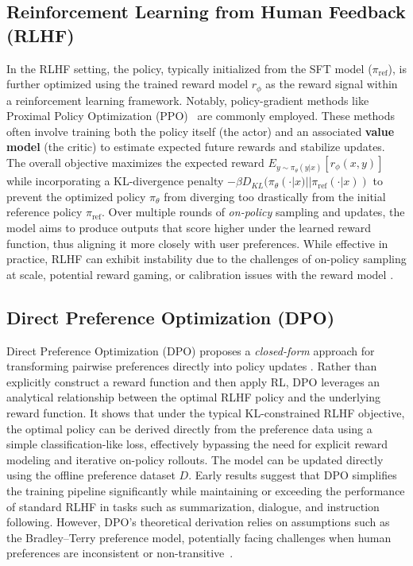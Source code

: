 \documentclass[a4paper,oneside,10pt,ngerman,english]{scrartcl}
\begin{document}
\subsection{Reinforcement Learning from Human Feedback (RLHF)}
\label{sec:rlhf-pipeline}
In the RLHF setting, the policy, typically initialized from the SFT model ($\pi_{\text{ref}}$), is further optimized using the
trained reward model $r_\phi$ as the reward signal within a reinforcement learning framework. Notably, policy-gradient methods like Proximal Policy Optimization (PPO)~\cite{bib:Schulman2017} are commonly employed. These methods often involve training both the policy itself (the actor) and an associated \textbf{value model} (the critic) to estimate expected future rewards and stabilize updates. The overall objective maximizes the expected reward $E_{y \sim \pi_\theta(y|x)}[r_\phi(x,y)]$ while incorporating a KL-divergence penalty $-\beta D_{KL}(\pi_\theta(\cdot|x) || \pi_{\text{ref}}(\cdot|x))$ to prevent the optimized policy $\pi_\theta$ from diverging too drastically from the initial reference policy $\pi_{\text{ref}}$. Over multiple rounds of
\emph{on-policy} sampling and updates, the model aims to produce outputs that score higher
under the learned reward function, thus aligning it more closely with user preferences. While
effective in practice, RLHF can exhibit instability due to the challenges of on-policy sampling at scale, potential reward
gaming, or calibration issues with the reward model \cite{bib:Gao2023}.

\subsection{Direct Preference Optimization (DPO)}
\label{sec:background-dpo}
Direct Preference Optimization (DPO) proposes a \emph{closed-form} approach for transforming
pairwise preferences directly into policy updates \cite{bib:Rafailov2023}. Rather than explicitly
construct a reward function and then apply RL, DPO leverages an analytical relationship between the optimal RLHF policy and the underlying reward function. It shows that under the typical KL-constrained RLHF objective, the optimal policy can be derived directly from the preference data using a simple classification-like loss, effectively bypassing the need for explicit reward modeling and iterative on-policy rollouts.
The model can be updated directly using the offline preference dataset $D$. Early results
suggest that DPO simplifies the training pipeline significantly while maintaining or exceeding
the performance of standard RLHF in tasks such as summarization, dialogue, and instruction
following. However, DPO’s theoretical derivation relies on assumptions such as the
Bradley--Terry preference model, potentially facing challenges when human preferences are inconsistent or non-transitive~\cite{bib:Tversky1969}.
\end{document}
